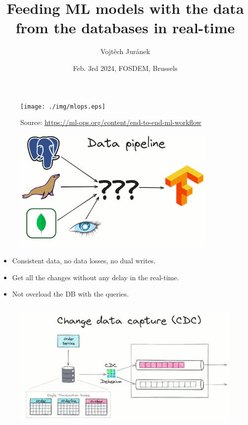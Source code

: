 \documentclass[10pt,utf8]{beamer}
\title{Feeding ML models with the data from the databases in real-time}
\author{Vojtěch Juránek}
\institute[Red Hat]{Red Hat}
\date{Feb. 3rd 2024, FOSDEM, Brussels}
\begin{document}


\begin{frame}
 \titlepage
\end{frame}


\begin{frame}
    \begin{figure}
        \centering
        \texttt{[image: ./img/mlops.eps]}
        \caption{\tiny{Source: \url{https://ml-ops.org/content/end-to-end-ml-workflow}}}
    \end{figure}
\end{frame}

\begin{frame}
    \begin{figure}
        \centering
        \includegraphics[height=6cm]{./img/dbs_to_tf2.eps}
    \end{figure}
    \begin{itemize}
      \item Consistent data, no data losses, no dual writes.
      \item Get all the changes without any delay in the real-time.
      \item Not overload the DB with the queries.
    \end{itemize}
\end{frame}

\begin{frame}
    \begin{figure}
        \centering
        \includegraphics[height=6.5cm]{./img/cdc2.eps}
    \end{figure}
\end{frame}
\end{document}
